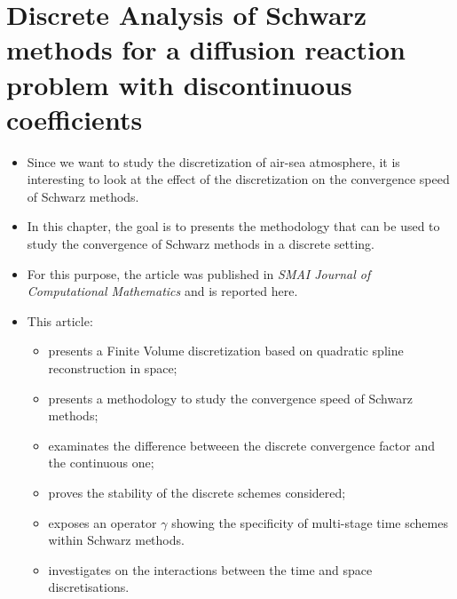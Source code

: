 \chapter{Discrete Analysis of Schwarz methods for a diffusion reaction problem with discontinuous coefficients}
\label{ch:discreteSchwarzAnalysis}
\minitoc
\begin{itemize}
\item Since we want to study the discretization
of air-sea atmosphere, it is interesting to look
at the effect of the discretization on the convergence
speed of Schwarz methods. 
\item In this chapter, the goal is to presents the methodology
that can be used to study the convergence
of Schwarz methods in a discrete setting.
\item For this purpose, the article
\citep{clement_discrete_2022-1} was published in
\textit{SMAI Journal of Computational Mathematics} and is reported
here.
\item This article:
\begin{itemize}
	\item presents a Finite Volume discretization based
	on quadratic spline reconstruction in space;
	\item presents a methodology to study the convergence
	speed of Schwarz methods;
	\item examinates the difference betweeen
	the discrete convergence factor and the continuous one;
	\item proves the stability of the discrete schemes considered;
	\item exposes an operator $\gamma$ showing the specificity
	of multi-stage time schemes within Schwarz methods.
	\item investigates on the interactions between the time
		and space discretisations.
\end{itemize}
\end{itemize}

